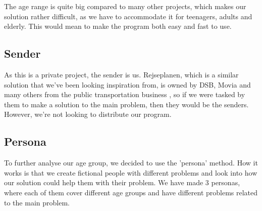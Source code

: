 The age range is quite big compared to many other projects, which makes our solution rather difficult, as we have to accommodate it for teenagers, adults and elderly. This would mean to make the program both easy and fast to use. 

\subsection{Sender} %

As this is a private project, the sender is us. Rejseplanen, which is a similar solution that we've been looking inspiration from, is owned by DSB, Movia and many others from the public transportation business \cite{om_rejseplanen}, so if we were tasked by them to make a solution to the main problem, then they would be the senders. However, we're not looking to distribute our program.

\subsection{Persona}

To further analyse our age group, we decided to use the 'persona' method. How it works is that we create fictional people with different problems and look into how our solution could help them  with their problem. We have made 3 personas, where each of them cover different age groups and have different problems related to the main problem. 


